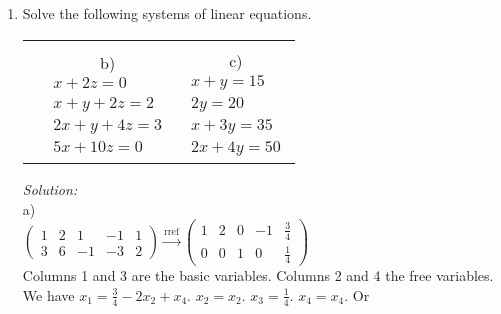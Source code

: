 \documentclass[12pt]{article}
\newif\ifsln
\begin{document}
\begin{enumerate}[1.]
\item  Solve the following systems of linear equations.

\begin{center}
\begin{tabular}{c c c}
	\begin{minipage}{0.3\textwidth}
	a)
	\begin{align*}
	x + 2y + z -  w = 1\\
	3x + 6y - z - 3w = 2
	\end{align*}	\\
	\end{minipage}
&	
	\begin{minipage}{0.3\textwidth}
	b)
	\begin{align*}
	x + 2z = 0\\
	x + y + 2z = 2\\
	2x + y + 4z = 3\\
	5x + 10z = 0
	\end{align*}
	\end{minipage}
&
	\begin{minipage}{0.3\textwidth}
	c)
	\begin{align*}
	x + y  = 15\\
	2y = 20\\
	x + 3y = 35\\
	2x + 4y = 50
	\end{align*}
	\end{minipage}
\end{tabular}
\end{center}


\ifsln
\textit{Solution:}\\
a)\\
$\left(
\begin{array}{cccc|c}
1 & 2 & 1  & -1 & 1\\
3 & 6 & -1 & -3 & 2 
\end{array}
\right)
\overset{\text{rref}}{\to}
\left(
\begin{array}{cccc|c}
1 & 2 & 0  & -1 & \frac{3}{4}\\
0 & 0 & 1 & 0 & \frac{1}{4} 
\end{array}
\right)
$\\

Columns 1 and 3 are the basic variables. Columns 2 and 4 the free variables. We have $x_{1} = \frac{3}{4} - 2x_{2} + x_{4}$. $x_{2} = x_{2}$. $x_{3} = \frac{1}{4}$. $x_{4} = x_{4}$. Or\\


\end{enumerate}
\end{document}
